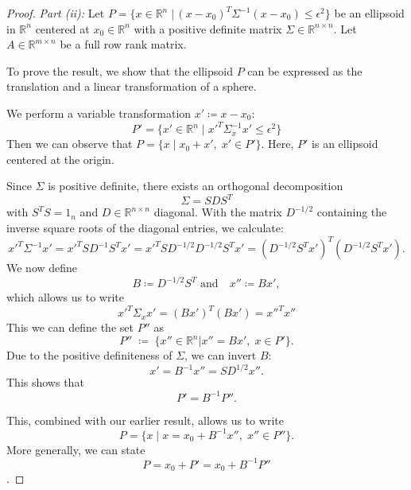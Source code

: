 \documentclass[10pt,a4paper]{amsart}
\begin{document}
\begin{proof}
	\emph{Part (ii):}
	Let $P=\{x \in \mathbb{R}^n \; \vert \, (x-x_0)^T \Sigma^{-1} (x-x_0) \leq \epsilon^2 \}$ be an ellipsoid in $\mathbb{R}^n$ centered at $x_0 \in \mathbb{R}^n$ with a positive definite matrix $\Sigma \in \mathbb{R}^{n \times n}$.
	Let $A \in \mathbb{R}^{m \times n}$ be a full row rank matrix.

	To prove the result, we show that the ellipsoid \(P\) can be expressed as the translation and a linear transformation of a sphere.
	
	We perform a variable transformation $x' \coloneqq x-x_0$:
	\begin{equation*}
		P' = \{x' \in \mathbb{R}^n \; \vert \; x'^T \Sigma_x^{-1}x' \leq \epsilon^2\}
	\end{equation*}
	Then we can observe that \(P = \{x \;\vert \; x_0 + x',\; x' \in P'\}\).
	Here, \(P'\) is an ellipsoid centered at the origin. 

	Since $\Sigma$ is positive definite, there exists an orthogonal decomposition
	\begin{equation*}
		\Sigma = S D S^T
	\end{equation*}
	with $S^T S = 1_n$ and $D \in \mathbb{R}^{n \times n}$ diagonal.
	With the matrix $D^{-1/2}$ containing the inverse square roots of the diagonal entries, we calculate:
	\begin{equation*}
		x'^T \Sigma^{-1} x' = x'^T S D^{-1} S^T x' = x'^T S D^{-1/2} D^{-1/2} S^T x' = (D^{-1/2} S^T x')^T (D^{-1/2} S^T x').
	\end{equation*}
	We now define
	\begin{equation*}
		B \coloneqq D^{-1/2} S^T \text{ and} \quad x'' \coloneqq Bx',
	\end{equation*}
	which allows us to write
	\begin{equation*}
		x'^T \Sigma_x x' = (Bx')^T(Bx') = x''^T x''
	\end{equation*}
	This  we can define the set \(P''\) as 
	\begin{equation*}
		P'' \; \coloneqq \; \{x'' \in \mathbb{R}^n \vert x'' = Bx', \; x \in P' \}.
	\end{equation*}
	Due to the positive definiteness of $\Sigma$, we can invert $B$:
	\begin{equation*}
		x' = B^{-1}x'' = S D^{1/2} x''.
	\end{equation*}
	This shows that 
	\[
	P' = B^{-1} P''.	
	\]

	This, combined with our earlier result, allows us to write 
	\[
	P = \{x \;\vert\; x = x_0 + B^{-1}x'',\; x'' \in P''\}.
	\] 
	More generally, we can state
	\[P = x_0 + P' = x_0 + B^{-1}P''\].


\end{proof}
\end{document}
